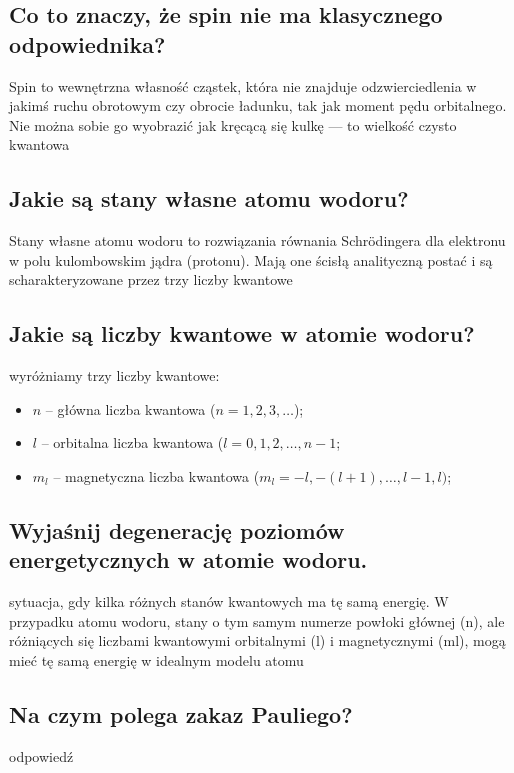 \subsection{Co to znaczy, że spin nie ma klasycznego odpowiednika?}

Spin to wewnętrzna własność cząstek, która nie znajduje odzwierciedlenia w jakimś ruchu obrotowym czy obrocie ładunku, tak jak moment pędu orbitalnego. Nie można sobie go wyobrazić jak kręcącą się kulkę — to wielkość czysto kwantowa

\subsection{Jakie są stany własne atomu wodoru?}

Stany własne atomu wodoru to rozwiązania równania Schrödingera dla elektronu w polu kulombowskim jądra (protonu). Mają one ścisłą analityczną postać i są scharakteryzowane przez trzy liczby kwantowe

\subsection{Jakie są liczby kwantowe w atomie wodoru?}
wyróżniamy trzy liczby kwantowe:
\begin{itemize}
  \item $n$ -- główna liczba kwantowa ($n=1,2,3,\dots$);
  \item $l$ -- orbitalna liczba kwantowa ($l=0,1,2,\dots,n-1$;
  \item $m_l$ -- magnetyczna liczba kwantowa ($m_l= -l,-(l+1),\dots, l-1, l)$;
\end{itemize}

\subsection{Wyjaśnij degenerację poziomów energetycznych w atomie wodoru.}

sytuacja, gdy kilka różnych stanów kwantowych ma tę samą energię. W przypadku atomu wodoru, stany o tym samym numerze powłoki głównej (n), ale różniących się liczbami kwantowymi orbitalnymi (l) i magnetycznymi (ml), mogą mieć tę samą energię w idealnym modelu atomu

\subsection{Na czym polega zakaz Pauliego?}

odpowiedź

